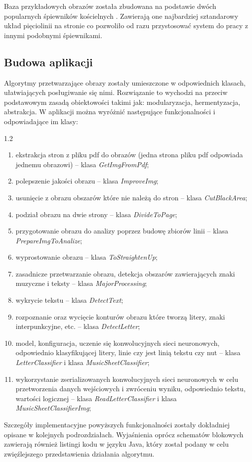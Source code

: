 \documentclass[a4paper,12pt]{article}
\newcommand\spacingInSolemnItemize{1.2}
\newcommand\spacingIndent{2.2em}
\newcommand\spacingVspace{0.7em}
\begin{document}
    Baza przykładowych obrazów została zbudowana na podstawie dwóch popularnych śpiewników kościelnych \cite{1, 2}. Zawierają one najbardziej sztandarowy układ pięciolinii na stronie co pozwoliło od razu przystosować system do pracy z innymi podobnymi śpiewnikami. 
    
	\subsection{Budowa aplikacji}
		\hspace{\spacingIndent} Algorytmy  przetwarzające obrazy zostały umieszczone w odpowiednich klasach, ułatwiających posługiwanie się nimi. Rozwiązanie to wychodzi na przeciw podstawowym zasadą obiektowości takimi jak: modularyzacja, hermentyzacja, abstrakcja. W aplikacji można wyróżnić następujące funkcjonalności i odpowiadające im klasy:
		\begin{spacing}{\spacingInSolemnItemize}
    		\begin{enumerate}
    			\item ekstrakcja stron z pliku pdf do obrazów (jedna strona pliku pdf odpowiada jednemu obrazowi) -- klasa \textit{GetImgFromPdf};
    			\item polepszenie jakości obrazu -- klasa \textit{ImproveImg};
    			\item usunięcie z obrazu obszarów które nie należą do stron -- klasa \textit{CutBlackArea};
    			\item podział obrazu na dwie strony -- klasa \textit{DivideToPage};
    			\item przygotowanie obrazu do analizy poprzez budowę zbiorów linii -- klasa \textit{PrepareImgToAnalize};
    			\item wyprostowanie obrazu -- klasa \textit{ToStraightenUp};
    			\item zasadnicze przetwarzanie obrazu, detekcja obszarów zawierających znaki muzyczne i teksty -- klasa \textit{MajorProcessing}; 
    			\item wykrycie tekstu -- klasa \textit{DetectText};
    			\item rozpoznanie oraz wycięcie konturów obrazu które tworzą litery, znaki interpunkcyjne, etc. -- klasa \textit{DetectLetter};
    			\item  model, konfiguracja, uczenie się konwolucyjnych sieci neuronowych, odpowiednio klasyfikującej litery, linie czy jest linią tekstu czy nut -- klasa \textit{LetterClassifier} i klasa \textit{MusicSheetClassifier};
    			\item wykorzystanie zserializowanych konwolucyjnych sieci neuronowych w celu przetworzenia danych wejściowych i zwróceniu wyniku, odpowiednio tekstu, wartości logicznej -- klasa \textit{ReadLetterClassifier} i klasa \textit{MusicSheetClassifierImg};
    		\end{enumerate} 
        \end{spacing}
        \vspace{\spacingVspace}
        Szczegóły implementacyjne powyższych funkcjonalności zostały dokładniej opisane w kolejnych podrozdziałach. Wyjaśnienia oprócz schematów blokowych zawierają również listingi kodu w języku Java, który został podany w celu zwięźlejszego przedstawienia działania algorytmu.
\end{document}
